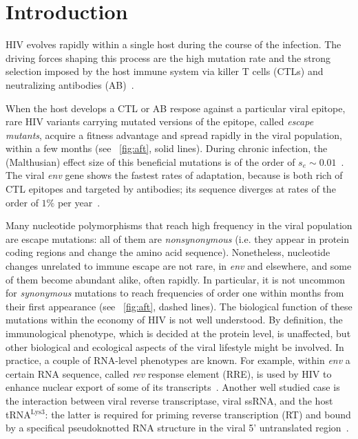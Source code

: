 \documentclass[12pt,a4paper,notitlepage,onecolumn]{article}
\newcommand{\env}{\textit{env}}
\newcommand{\rev}{\textit{rev}}
\begin{document}
\section{Introduction}

HIV evolves rapidly within a single host during the course of the infection. The
driving forces shaping this process are the high mutation rate and the strong
selection imposed by the host immune system via killer T cells (CTLs) and
neutralizing antibodies (AB)~\citep{pantaleo_immunopathogenesis_1996}.

When the host develops a CTL or AB respose against a particular viral epitope,
rare HIV variants carrying mutated versions of the epitope, called {\it escape
mutants}, acquire a fitness advantage and spread rapidly in the viral
population, within a few months (see \figurename~\ref{fig:aft}, solid lines).
During chronic infection, the (Malthusian) effect size of this beneficial
mutations is of the order of $s_e \sim 0.01$~\citep{neher_recombination_2010}.
The viral \env{} gene shows the fastest rates of adaptation, because is both
rich of CTL epitopes and targeted by antibodies; its sequence diverges at rates
of the order of $1\%$ per year~\citep{shankarappa_consistent_1999}.

Many nucleotide polymorphisms that reach high frequency in the viral population
are escape mutations: all of them are {\it nonsynonymous} (i.e. they appear in
protein coding regions and change the amino acid sequence). Nonetheless,
nucleotide changes unrelated to immune escape are not rare, in \env{} and
elsewhere, and some of them become abundant alike, often rapidly. In particular,
it is not uncommon for {\it synonymous} mutations to reach frequencies of order
one within months from their first appearance (see \figurename~\ref{fig:aft},
dashed lines). The biological function of these mutations within the economy of
HIV is not well understood. By definition, the immunological phenotype, which is
decided at the protein level, is unaffected, but other biological and ecological
aspects of the viral lifestyle might be involved. In practice, a couple of
RNA-level phenotypes are known. For example, within \env{} a certain RNA
sequence, called \rev{} response element (RRE), is used by HIV to enhance
nuclear export of some of its transcripts~\citep{fernandes_hiv-1_2012}. Another
well studied case is the interaction between viral reverse transcriptase, viral
ssRNA, and the host tRNA$^\text{Lys3}$: the latter is required for priming
reverse transcription (RT) and bound by a specifical pseudoknotted RNA structure
in the viral 5' untranslated region~\citep{barat_interaction_1991,
paillart_vitro_2002}.
\end{document}
